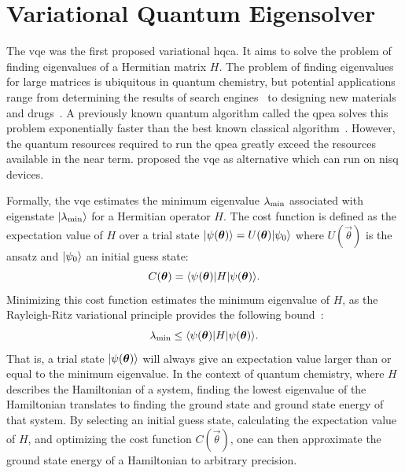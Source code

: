 \section{Variational Quantum Eigensolver} \label{sec:vqe}
The \gls{vqe} was the first proposed variational \gls{hqca}.
It aims to solve the problem of finding eigenvalues of a Hermitian matrix $H$.
The problem of finding eigenvalues for large matrices is ubiquitous in quantum chemistry, but potential applications range from determining the results of search engines~\cite{page1999pagerank} to designing new materials and drugs~\cite{golub2000eigenvalue}.
A previously known quantum algorithm called the \acrfull{qpea} solves this problem exponentially faster than the best known classical algorithm~\cite{abrams1999quantum}.
However, the quantum resources required to run the \gls{qpea} greatly exceed the resources available in the near term.
\textcite{peruzzo2014variational} proposed the \gls{vqe} as alternative which can run on \gls{nisq} devices.

Formally, the \gls{vqe} estimates the minimum eigenvalue $\lambda_{\textnormal{min}}$ associated with eigenstate $\vert{\lambda_{\textnormal{min}}}\rangle$ for a Hermitian operator $H$.
The cost function is defined as the expectation value of $H$ over a trial state $\vert{\psi({\bm{\theta}})}\rangle = U(\bm{\theta})\vert{\psi_0}\rangle$ where $U(\vec{\theta})$ is the ansatz and $\vert{\psi_0}\rangle$ an initial guess state:
\begin{equation}
C(\bm{\theta}) = \langle{\psi(\bm{\theta})}\vert H\vert{\psi(\bm{\theta})}\rangle.
\end{equation}
Minimizing this cost function estimates the minimum eigenvalue of $H$, as the Rayleigh-Ritz variational principle provides the following bound~\cite{ritz1909neue}:
\begin{equation}
\lambda_{\textnormal{min}} \leq \langle{\psi(\bm{\theta})}\vert H\vert{\psi(\bm{\theta})}\rangle.
\end{equation}
That is, a trial state $\vert{\psi({\bm{\theta}})}\rangle$ will always give an expectation value larger than or equal to the minimum eigenvalue.
In the context of quantum chemistry, where $H$ describes the Hamiltonian of a system, finding the lowest eigenvalue of the Hamiltonian translates to finding the ground state and ground state energy of that system.
By selecting an initial guess state, calculating the expectation value of $H$, and optimizing the cost function $C(\vec{\theta})$, one can then approximate the ground state energy of a Hamiltonian to arbitrary precision.

